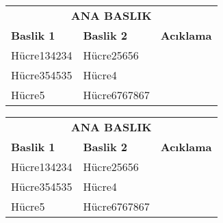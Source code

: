 \documentclass{article}
\begin{document}
\newpage
\begin{sideways}
        \begin{tabular}{|l|l|p{3cm}|}  %
        \hline %
        \multicolumn{3}{|c|}{\textbf{ANA BASLIK}}\\ [2ex] \cline{1-3} %
        \textbf{Baslik 1}   & \textbf{Baslik 2}  & \textbf{ Acıklama}\\ [2ex] \cline{1-3}  %
         Hücre134234        &  Hücre25656        & \dotfill \\ [2ex]
         Hücre354535        &  Hücre4            & \dotfill \\ [2ex]
         Hücre5             &  Hücre6767867      & \dotfill \\ [2ex] \cline{1-3}
    \end{tabular}
\end{sideways}

\lipsum[6-7]

\vspace{8cm}
\begin{rotate}{30}
        \begin{tabular}{|l|l|p{3cm}|}  %
        \hline %
        \multicolumn{3}{|c|}{\textbf{ANA BASLIK}}\\ [2ex] \cline{1-3} %
        \textbf{Baslik 1}   & \textbf{Baslik 2}  & \textbf{ Acıklama}\\ [2ex] \cline{1-3}  %
         Hücre134234        &  Hücre25656        & \dotfill \\ [2ex]
         Hücre354535        &  Hücre4            & \dotfill \\ [2ex]
         Hücre5             &  Hücre6767867      & \dotfill \\ [2ex] \cline{1-3}
    \end{tabular}
\end{rotate}
\end{document}
